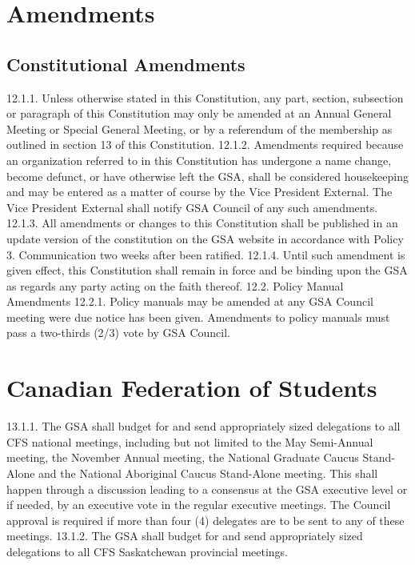 \documentclass{article}
\begin{document}
\section{Amendments }
\subsection{Constitutional Amendments }
12.1.1. Unless otherwise stated in this Constitution, any part, section, 
subsection or paragraph of this Constitution may only be amended at 
an Annual General Meeting or Special General Meeting, or by a 
referendum of the membership as outlined in section 13 of this 
Constitution. 
12.1.2. Amendments required because an organization referred to in this 
Constitution has undergone a name change, become defunct, or have 
otherwise left the GSA, shall be considered housekeeping and may be 
entered as a matter of course by the Vice President External. The Vice 
President External shall notify GSA Council of any such amendments. 
12.1.3. All amendments or changes to this Constitution shall be published 
in an update version of the constitution on the GSA website in 
accordance with Policy 3. Communication two weeks after been ratified. 
12.1.4. Until such amendment is given effect, this Constitution shall 
remain in force and be binding upon the GSA as regards any party 
acting on the faith thereof. 
12.2. Policy Manual Amendments 
12.2.1. Policy manuals may be amended at any GSA Council meeting were 
due notice has been given. Amendments to policy manuals must pass a 
two-thirds (2/3) vote by GSA Council. 
\section{ Canadian Federation of Students} 
13.1.1. The GSA shall budget for and send appropriately sized delegations 
to all CFS national meetings, including but not limited to the May 
Semi-Annual meeting, the November Annual meeting, the National 
Graduate Caucus Stand-Alone and the National Aboriginal Caucus 
Stand-Alone meeting. This shall happen through a discussion leading 
to a consensus at the GSA executive level or if needed, by an 
executive vote in the regular executive meetings. The Council 
approval is required if more than four (4) delegates are to be sent to 
any of these meetings. 
13.1.2. The GSA shall budget for and send appropriately sized delegations 
to all CFS Saskatchewan provincial meetings. 
\end{document}
